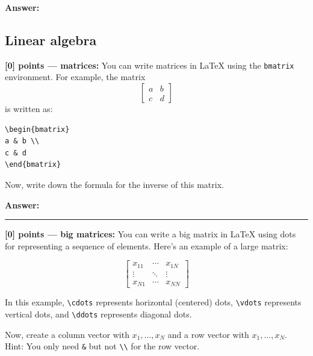\documentclass{article}
\newcommand{\mydivider}{\vspace{1em}\hrule\vspace{1em}}
\begin{document}
\begin{tcolorbox}
\textbf{Answer: }


\end{tcolorbox}


\subsection{Linear algebra}

\noindent\textbf{[0] points --- matrices:} You can write matrices in LaTeX using the \verb|bmatrix| environment. For example, the matrix
\[
\begin{bmatrix}
a & b \\
c & d
\end{bmatrix}
\]
is written as:

\begin{verbatim}
\begin{bmatrix}
a & b \\
c & d
\end{bmatrix}
\end{verbatim}

Now, write down the formula for the inverse of this matrix.

\begin{tcolorbox}
\textbf{Answer: }


\end{tcolorbox}



\mydivider

\noindent\textbf{[0] points --- big matrices:} You can write a big matrix in LaTeX using dots for representing a sequence of elements. Here's an example of a large matrix:

\[
\begin{bmatrix}
x_{11} & \cdots & x_{1N} \\
\vdots & \ddots & \vdots \\
x_{N1} & \cdots & x_{NN}
\end{bmatrix}
\]

In this example, \verb|\cdots| represents horizontal (centered) dots, \verb|\vdots| represents vertical dots, and \verb|\ddots| represents diagonal dots.

Now, create a column vector with $x_1, \ldots, x_N$ and a row vector with $x_1, \ldots, x_N$. Hint: You only need \verb|&| but not \verb|\\| for the row vector.
\end{document}
